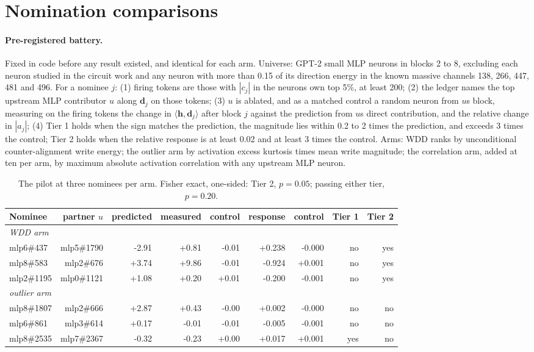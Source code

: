 \section{Nomination comparisons}\label{app:bakeoff}
\paragraph{Pre-registered battery.} Fixed in code before any result existed, and identical for each arm. Universe: GPT-2 small MLP neurons in blocks 2 to 8, excluding each neuron studied in the circuit work and any neuron with more than 0.15 of its direction energy in the known massive channels 138, 266, 447, 481 and 496. For a nominee $j$: (1) firing tokens are those with $|c_j|$ in the neuron\textquotesingle s own top 5\%, at least 200; (2) the ledger names the top upstream MLP contributor $u$ along $\mathbf{d}_j$ on those tokens; (3) $u$ is ablated, and as a matched control a random neuron from $u$\textquotesingle s block, measuring on the firing tokens the change in $\langle \mathbf{h}, \mathbf{d}_j\rangle$ after block $j$ against the prediction from $u$\textquotesingle s direct contribution, and the relative change in $|a_j|$; (4) Tier 1 holds when the sign matches the prediction, the magnitude lies within 0.2 to 2 times the prediction, and exceeds 3 times the control; Tier 2 holds when the relative response is at least 0.02 and at least 3 times the control. Arms: WDD ranks by unconditional counter-alignment write energy; the outlier arm by activation excess kurtosis times mean write magnitude; the correlation arm, added at ten per arm, by maximum absolute activation correlation with any upstream MLP neuron.
\begin{table}[H]\centering\footnotesize
\caption{The pilot at three nominees per arm. Fisher exact, one-sided: Tier 2, $p=0.05$; passing either tier, $p=0.20$.}\label{app:pilot}
\begin{adjustbox}{max width=\linewidth}
\begin{tabular}{lrrrrrrrr}\toprule
Nominee & partner $u$ & predicted & measured & control & response & control & Tier 1 & Tier 2 \\ \midrule
\multicolumn{9}{l}{\emph{WDD arm}} \\
mlp6\#437 & mlp5\#1790 & -2.91 & +0.81 & -0.01 & +0.238 & -0.000 & no & yes \\
mlp8\#583 & mlp2\#676 & +3.74 & +9.86 & -0.01 & -0.924 & +0.001 & no & yes \\
mlp2\#1195 & mlp0\#1121 & +1.08 & +0.20 & +0.01 & -0.200 & -0.001 & no & yes \\
\multicolumn{9}{l}{\emph{outlier arm}} \\
mlp8\#1807 & mlp2\#666 & +2.87 & +0.43 & -0.00 & +0.002 & -0.000 & no & no \\
mlp6\#861 & mlp3\#614 & +0.17 & -0.01 & -0.01 & -0.005 & -0.001 & no & no \\
mlp8\#2535 & mlp7\#2367 & -0.32 & -0.23 & +0.00 & +0.017 & +0.001 & yes & no \\
\bottomrule\end{tabular}\end{adjustbox}
\end{table}
